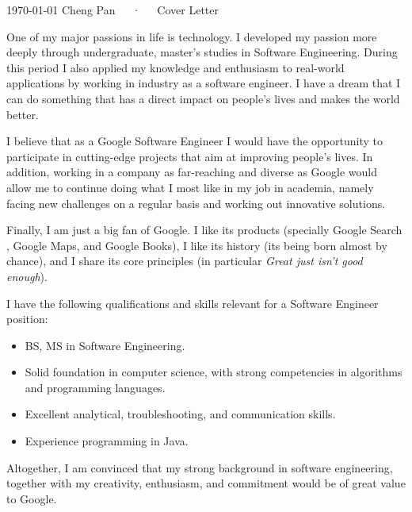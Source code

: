 \documentclass[11pt, a4paper]{awesome-cv}
\begin{document}
\makecvheader[R]

\makecvfooter
  {\today}
  {Cheng Pan~~~·~~~Cover Letter}
  {}

\makelettertitle

\begin{cvletter}

One of my major passions in life is technology. I developed my passion more deeply through undergraduate, master's studies in Software Engineering. During this period I also applied my knowledge and enthusiasm to real-world applications by working in industry as a software engineer. I have a dream that I can do something that has a direct impact on people's lives and makes the world better.

I believe that as a Google Software Engineer I would have the opportunity to participate in cutting-edge projects that aim at improving people's lives. In addition, working in a company as far-reaching and diverse as Google would allow me to continue doing what I most like in my job in academia, namely facing new challenges on a regular basis and working out innovative solutions.

Finally, I am just a big fan of Google. I like its products (specially Google Search , Google Maps, and Google Books), I like its history (its being born almost by chance), and I share its core principles (in particular \emph{Great just isn't good enough}).

I have the following qualifications and skills relevant for a Software Engineer position:

\begin{itemize}
	\item BS, MS in Software Engineering.
	\item Solid foundation in computer science, with strong competencies in algorithms and programming languages.
	\item Excellent analytical, troubleshooting, and communication skills.
	\item Experience programming in Java.
\end{itemize}

Altogether, I am convinced that my strong background in software engineering, together with my creativity, enthusiasm, and commitment would be of great value to Google.

\end{cvletter}


\makeletterclosing
\end{document}
